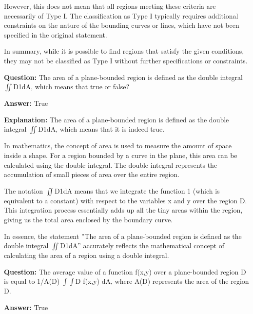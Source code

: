 \documentclass{article}
\begin{document}
However, this does not mean that all regions meeting these criteria are necessarily of Type I. The classification as Type I typically requires additional constraints on the nature of the bounding curves or lines, which have not been specified in the original statement.

In summary, while it is possible to find regions that satisfy the given conditions, they may not be classified as Type I without further specifications or constraints.
                
                \vspace{0.5cm} 
        
            
                \textbf {Question:} The area of a plane-bounded region is defined as the double integral \ensuremath{\iint}D1dA, which means that true or false?
                
                \textbf{Answer:} True

                \textbf{Explanation:} The area of a plane-bounded region is defined as the double integral \ensuremath{\iint}D1dA, which means that it is indeed true.

In mathematics, the concept of area is used to measure the amount of space inside a shape. For a region bounded by a curve in the plane, this area can be calculated using the double integral. The double integral represents the accumulation of small pieces of area over the entire region.

The notation \ensuremath{\iint}D1dA means that we integrate the function 1 (which is equivalent to a constant) with respect to the variables x and y over the region D. This integration process essentially adds up all the tiny areas within the region, giving us the total area enclosed by the boundary curve.

In essence, the statement ''The area of a plane-bounded region is defined as the double integral \ensuremath{\iint}D1dA'' accurately reflects the mathematical concept of calculating the area of a region using a double integral.
                
                \vspace{0.5cm} 
        
            
                \textbf {Question:} The average value of a function f(x,y) over a plane-bounded region D is equal to 1/A(D) \ensuremath{\int}\ensuremath{\int}D f(x,y) dA, where A(D) represents the area of the region D.
                
                \textbf{Answer:} True
\end{document}
